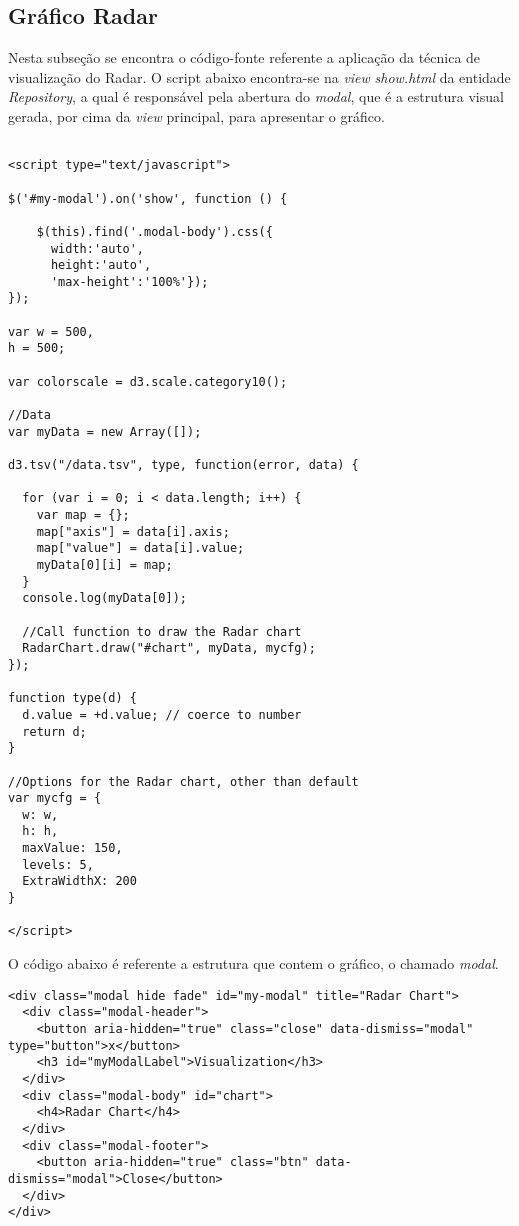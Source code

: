 \subsection{Gráfico Radar}
Nesta subseção se encontra o código-fonte referente a aplicação da técnica de visualização do Radar. O script abaixo encontra-se na \textit{view} \textit{show.html} da entidade \textit{Repository}, a qual é responsável pela abertura do \textit{modal}, que é a estrutura visual gerada, por cima da \textit{view} principal, para apresentar o gráfico.

\begin{lstlisting}

<script type="text/javascript">

$('#my-modal').on('show', function () {

    $(this).find('.modal-body').css({
      width:'auto',
      height:'auto', 
      'max-height':'100%'});
});

var w = 500,
h = 500;

var colorscale = d3.scale.category10();

//Data
var myData = new Array([]);

d3.tsv("/data.tsv", type, function(error, data) {
  
  for (var i = 0; i < data.length; i++) { 
    var map = {};
    map["axis"] = data[i].axis;
    map["value"] = data[i].value;   
    myData[0][i] = map;
  }
  console.log(myData[0]);

  //Call function to draw the Radar chart
  RadarChart.draw("#chart", myData, mycfg);
});

function type(d) {
  d.value = +d.value; // coerce to number
  return d;
}

//Options for the Radar chart, other than default
var mycfg = {
  w: w,
  h: h,
  maxValue: 150,
  levels: 5,
  ExtraWidthX: 200
}

</script>

\end{lstlisting}

O código abaixo é referente a estrutura que contem o gráfico, o chamado \textit{modal}.

\begin{lstlisting}
<div class="modal hide fade" id="my-modal" title="Radar Chart">
  <div class="modal-header">
    <button aria-hidden="true" class="close" data-dismiss="modal" type="button">x</button>
    <h3 id="myModalLabel">Visualization</h3>
  </div>
  <div class="modal-body" id="chart">
    <h4>Radar Chart</h4>
  </div>
  <div class="modal-footer">
    <button aria-hidden="true" class="btn" data-dismiss="modal">Close</button>
  </div>
</div>
\end{lstlisting}

